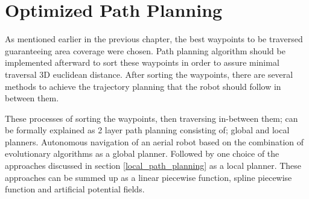 \chapter{Optimized Path Planning} \label{chap:trial}

As mentioned earlier in the previous chapter, the best waypoints to be traversed guaranteeing area coverage were chosen. Path planning algorithm should be implemented afterward to sort these waypoints in order to assure minimal traversal 3D euclidean distance. After sorting the waypoints, there are several methods to achieve the trajectory planning that the robot should follow in between them.

These processes of sorting the waypoints, then traversing in-between them;  can be formally explained as 2 layer path planning consisting of; global and local planners. Autonomous navigation of an aerial robot based on the combination of evolutionary algorithms as a global planner. Followed by one choice of the approaches discussed in section \ref{local_path_planning} as a local planner. These approaches can be summed up as a linear piecewise function, spline piecewise function and artificial potential fields.





